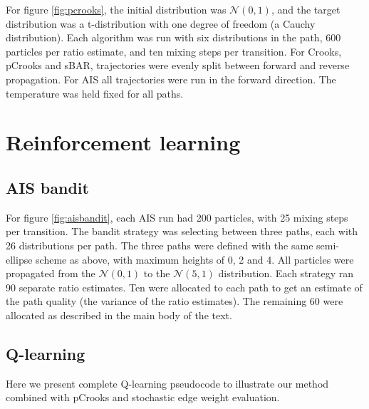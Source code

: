For figure \ref{fig:pcrooks}, the initial distribution was $\mathcal{N}(0,1)$, and the target distribution was a t-distribution with one degree of freedom (a Cauchy distribution).
Each algorithm was run with six distributions in the path, 600 particles per ratio estimate, and ten mixing steps per transition.
For Crooks, pCrooks and sBAR, trajectories were evenly split between forward and reverse propagation. 
For AIS all trajectories were run in the forward direction.
The temperature was held fixed for all paths.



\section{Reinforcement learning} %
\label{sec:reinforcement_learning}

\subsection{AIS bandit} %
\label{sub:ais_bandit}

For figure \ref{fig:aisbandit}, each AIS run had 200 particles, with 25 mixing steps per transition.
The bandit strategy was selecting between three paths, each with 26 distributions per path. 
The three paths were defined with the same semi-ellipse scheme as above, with maximum heights of 0, 2 and 4.
All particles were propagated from the $\mathcal{N}(0,1)$ to the $\mathcal{N}(5,1)$ distribution.
Each strategy ran 90 separate ratio estimates. 
Ten were allocated to each path to get an estimate of the path quality (the variance of the ratio estimates). 
The remaining 60 were allocated as described in the main body of the text.

\subsection{Q-learning} %
\label{sub:q_learning}

Here we present complete Q-learning pseudocode to illustrate our method combined with pCrooks and stochastic edge weight evaluation.


